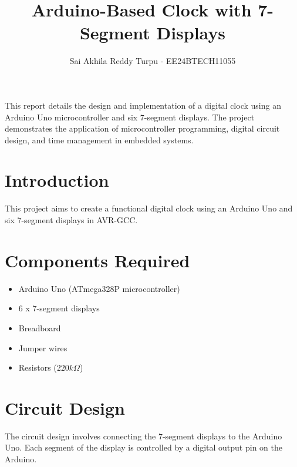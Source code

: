 \documentclass[journal]{IEEEtran}
\begin{document}
\title{Arduino-Based Clock with 7-Segment Displays}
\author{Sai Akhila Reddy Turpu - EE24BTECH11055}

\maketitle


This report details the design and implementation of a digital clock using an Arduino Uno microcontroller and six 7-segment displays. The project demonstrates the application of microcontroller programming, digital circuit design, and time management in embedded systems.


\section{Introduction}
 This project aims to create a functional digital clock using an Arduino Uno and six 7-segment displays in AVR-GCC.

\section{Components Required}
\begin{itemize}
    \item Arduino Uno (ATmega328P microcontroller)
    \item 6 x 7-segment displays
    \item Breadboard
    \item Jumper wires
    \item Resistors ($220 k\Omega$)
\end{itemize}

\section{Circuit Design}
The circuit design involves connecting the 7-segment displays to the Arduino Uno. Each segment of the display is controlled by a digital output pin on the Arduino. 
\end{document}

